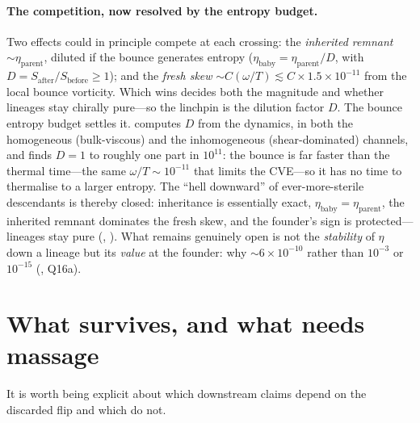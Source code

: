 \paragraph{The competition, now resolved by the entropy budget.} Two effects
could in principle compete at each crossing: the \emph{inherited remnant}
$\sim\eta_{\mathrm{parent}}$, diluted if the bounce generates entropy
($\eta_{\mathrm{baby}}=\eta_{\mathrm{parent}}/D$, with $D=S_{\mathrm{after}}/
S_{\mathrm{before}}\ge1$); and the \emph{fresh skew} $\sim C(\omega/T)\lesssim
C\times1.5\times10^{-11}$ from the local bounce vorticity. Which wins decides both
the magnitude and whether lineages stay chirally pure---so the linchpin is the
dilution factor $D$. The bounce entropy budget settles it. 
computes $D$ from the dynamics, in both the homogeneous (bulk-viscous) and the
inhomogeneous (shear-dominated) channels, and finds $D=1$ to roughly one part in
$10^{11}$: the bounce is far faster than the thermal time---the same
$\omega/T\sim10^{-11}$ that limits the CVE---so it has no time to thermalise to a
larger entropy. The ``hell downward'' of ever-more-sterile descendants is thereby
closed: inheritance is essentially exact, $\eta_{\mathrm{baby}}=
\eta_{\mathrm{parent}}$, the inherited remnant dominates the fresh skew, and the
founder's sign is protected---lineages stay pure
(, ). What remains genuinely
open is not the \emph{stability} of $\eta$ down a lineage but its \emph{value} at
the founder: why $\sim6\times10^{-10}$ rather than $10^{-3}$ or $10^{-15}$
(, Q16a).

\section{What survives, and what needs massage}

It is worth being explicit about which downstream claims depend on the discarded
flip and which do not.

